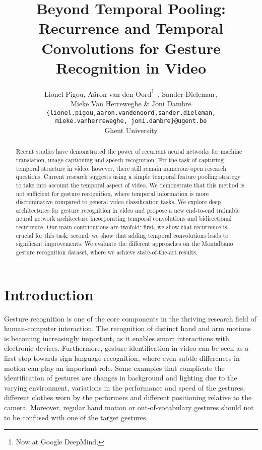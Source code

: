 \documentclass[11pt,a4paper]{article} \usepackage{a4wide}
\title{\vspace{-2cm}Beyond Temporal Pooling: Recurrence and Temporal Convolutions for Gesture Recognition in Video}
\author{Lionel Pigou, A\"aron van den Oord\thanks{Now at Google DeepMind.} \,, Sander Dieleman\footnotemark[1]  \,,\\ Mieke Van Herreweghe \& Joni Dambre\\
\texttt{\{lionel.pigou,aaron.vandenoord,sander.dieleman,}\\
\texttt{mieke.vanherreweghe, joni.dambre\}@ugent.be} \\
Ghent University
}
\begin{document}
\maketitle

\begin{abstract}
Recent studies have demonstrated the power of recurrent neural networks for machine translation, image captioning and speech recognition. For the task of capturing temporal structure in video, however, there still remain numerous open research questions. Current research suggests using a simple temporal feature pooling strategy to take into account the temporal aspect of video. We demonstrate that this method is not sufficient for gesture recognition, where temporal information is more discriminative compared to general video classification tasks. We explore deep architectures for gesture recognition in video and propose a new end-to-end trainable neural network architecture incorporating temporal convolutions and bidirectional recurrence. Our main contributions are twofold; first, we show that recurrence is crucial for this task; second, we show that adding temporal convolutions leads to significant improvements. We evaluate the different approaches on the Montalbano gesture recognition dataset, where we achieve state-of-the-art results.
\end{abstract}

\section{Introduction} \label{sec:intro}
Gesture recognition is one of the core components in the thriving research field of human-computer interaction. 
The recognition of distinct hand and arm motions is becoming increasingly important, as it enables smart interactions with electronic devices.
Furthermore, gesture identification in video can be seen as a first step towards sign language recognition, where even subtle differences in motion can play an important role. 
Some examples that complicate the identification of gestures are changes in background and lighting due to the varying environment, variations in the performance and speed of the gestures, different clothes worn by the performers and different positioning relative to the camera.
Moreover, regular hand motion or out-of-vocabulary gestures should not to be confused with one of the target gestures.
\end{document}
